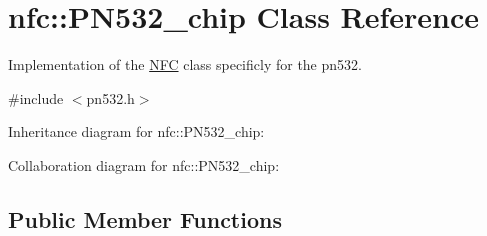 \hypertarget{classnfc_1_1PN532__chip}{}\section{nfc\+:\+:P\+N532\+\_\+chip Class Reference}
\label{classnfc_1_1PN532__chip}


Implementation of the \hyperlink{classnfc_1_1NFC}{N\+FC} class specificly for the pn532.  




{\ttfamily \#include $<$pn532.\+h$>$}



Inheritance diagram for nfc\+:\+:P\+N532\+\_\+chip\+:


Collaboration diagram for nfc\+:\+:P\+N532\+\_\+chip\+:
\subsection*{Public Member Functions}
